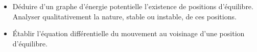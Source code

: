 \documentclass[../../main/main.tex]{subfiles}
\begin{document}
\begin{prgm}
\begin{tcb}
\begin{itemize}
			\item Déduire d'un graphe d'énergie potentielle l'existence de positions
			      d'équilibre. Analyser qualitativement la nature, stable ou instable,
			      de ces positions.

			\item Établir l'équation différentielle du mouvement au voisinage d'une
			      position d'équilibre.
		\end{itemize}
	\end{tcb}
\end{prgm}

\vspace*{\fill}

\newpage

\vspace*{\fill}
\minitoc
\vspace*{\fill}

\newpage
\end{document}

